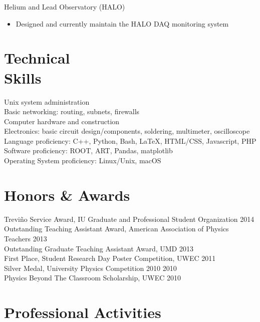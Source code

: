 \documentclass[11pt]{cv}
\begin{document}
\begin{cv}
Helium and Lead Observatory (HALO)
\begin{itemize}
  \item Designed and currently maintain the HALO DAQ monitoring system
\end{itemize}


\section{Technical \\ Skills}
Unix system administration \\
Basic networking: routing, subnets, firewalls \\
Computer hardware and construction \\
Electronics: basic circuit design/components, soldering, multimeter, oscilloscope \\
Language proficiency: C++, Python, Bash, \LaTeX, HTML/CSS, Javascript, PHP \\
Software proficiency: ROOT, ART, Pandas, matplotlib \\
Operating System proficiency: Linux/Unix, macOS


\section{Honors \& Awards}

Trevi\~{n}o Service Award, IU Graduate and Professional Student Organization \hfill 2014 \\
Outstanding Teaching Assistant Award, American Association of Physics Teachers \hfill 2013 \\
Outstanding Graduate Teaching Assistant Award, UMD \hfill 2013 \\
First Place, Student Research Day Poster Competition, UWEC \hfill 2011 \\
Silver Medal, University Physics Competition 2010 \hfill 2010 \\
Physics Beyond The Classroom Scholarship, UWEC \hfill 2010


\section{Professional Activities}


\end{cv}
\end{document}
